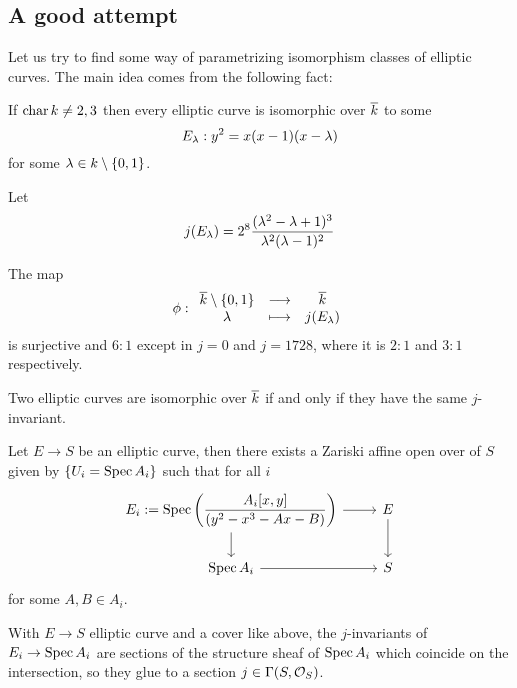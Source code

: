 \subsection{A good attempt}
Let us try to find some way of parametrizing isomorphism classes of elliptic curves. The main idea comes from the following fact:

\begin{fact}
If $\operatorname{char} k\neq2,3$ then every elliptic curve is isomorphic over $\overline{k}$ to some
\[E_\lambda:y^2=x(x-1)(x-\lambda)\] 
for some $\lambda\in k\setminus\left\{{0,1}\right\}$.
\end{fact}

\begin{definition}[$j$-invariant]
Let
\[j(E_\lambda)=2^8\frac{(\lambda^2-\lambda+1)^3}{\lambda^2(\lambda-1)^2}\]
\end{definition}

\begin{fact}
The map
\[\phi:\begin{array}{ccc} {\overline{k}\setminus\left\{{0,1}\right\}} & \longrightarrow & {\overline{k}}\\ {\lambda} & \longmapsto & {j(E_\lambda)} \end{array}\]
is surjective and $6:1$ except in $j=0$ and $j=1728$, where it is $2:1$ and $3:1$ respectively.
\end{fact}

\begin{fact}
Two elliptic curves are isomorphic over $\overline{k}$ if and only if they have the same $j$-invariant.
\end{fact}


\begin{theorem}
Let $E\to S$ be an elliptic curve, then there exists a Zariski affine open over of $S$ given by $\left\{{U_i=\operatorname{Spec} A_i}\right\}$ such that for all $i$
\[\begin{tikzcd}
	{E_i:=\Spec\pa{\dfrac{A_i[x,y]}{(y^2-x^3-Ax-B)}}} & E \\
	{\Spec A_i} & S
	\arrow[from=1-1, to=1-2]
	\arrow[from=1-1, to=2-1]
	\arrow[from=1-2, to=2-2]
	\arrow[from=2-1, to=2-2]
\end{tikzcd}\]
for some $A,B\in A_i$.
\end{theorem}

\begin{remark}
With $E\to S$ elliptic curve and a cover like above, the $j$-invariants of $E_i\to \operatorname{Spec} A_i$ are sections of the structure sheaf of $\operatorname{Spec} A_i$ which coincide on the intersection, so they glue to a section $j\in \Gamma(S,\mathcal{O}_S)$.
\end{remark}

